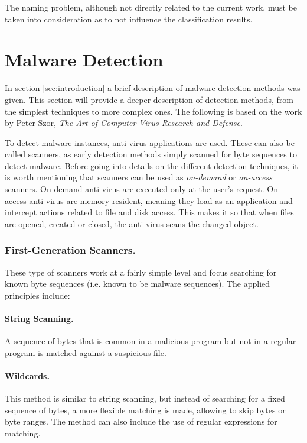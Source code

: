 The naming problem, although not directly related to the current work, must be taken into consideration as to not influence the classification results.

\section{Malware Detection}
\label{section:mal_detec}

In section \ref{sec:introduction} a brief description of malware detection methods was given. This section will provide a deeper description of detection methods, from the simplest techniques to more complex ones. The following is based on the work by Peter Szor, \textit{The Art of Computer Virus Research and Defense}\cite{szor:art}.

To detect malware instances, anti-virus applications are used. These can also be called scanners, as early detection methods simply scanned for byte sequences to detect malware. Before going into details on the different detection techniques, it is worth mentioning that scanners can be used as \textit{on-demand} or \textit{on-access} scanners. On-demand anti-virus are executed only at the user's request. On-access anti-virus are memory-resident, meaning they load as an application and intercept actions related to file and disk access. This makes it so that when files are opened, created or closed, the anti-virus scans the changed object.

\subsubsection{First-Generation Scanners.} These type of scanners work at a fairly simple level and focus searching for known byte sequences (i.e. known to be malware sequences). The applied principles include:

\paragraph{String Scanning.} A sequence of bytes that is common in a malicious program but not in a regular program is matched against a suspicious file. 

\paragraph{Wildcards.} This method is similar to string scanning, but instead of searching for a fixed sequence of bytes, a more flexible matching is made, allowing to skip bytes or byte ranges. The method can also include the use of regular expressions for matching.

